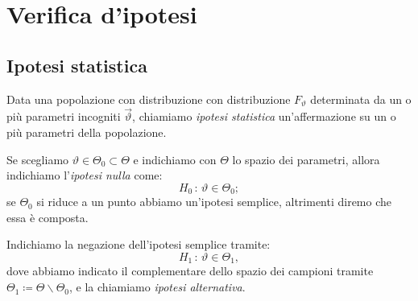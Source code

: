 
\chapter{Verifica d'ipotesi}
    \section{Ipotesi statistica}
        \begin{defn}
            Data una popolazione con distribuzione con distribuzione $F_\vartheta$ determinata da un o più 
            parametri incogniti $\vec{\vartheta}$, chiamiamo \emph{ipotesi statistica} un'affermazione 
            su un o più parametri della popolazione.

            Se scegliamo $\vartheta \in \Theta_0 \subset \Theta$ e indichiamo con $\Theta$ lo spazio dei 
            parametri, allora indichiamo l'\emph{ipotesi nulla} come: \[
                H_0 \,:\, \vartheta \in \Theta_0
            ;\] se $\Theta_0$ si riduce a un punto abbiamo un'ipotesi semplice, altrimenti diremo che essa 
            è composta.

            Indichiamo la negazione dell'ipotesi semplice tramite: \[
                H_1 \,:\, \vartheta \in \Theta_1
            ,\] dove abbiamo indicato il complementare dello spazio dei campioni tramite 
            $\Theta_1 \coloneqq \Theta\backslash \Theta_0$, e la chiamiamo \emph{ipotesi alternativa}.
        \end{defn}

